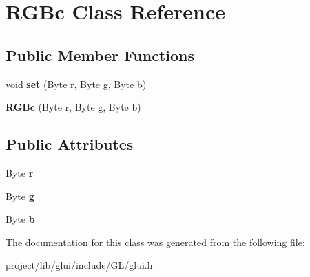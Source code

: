 \hypertarget{classRGBc}{\section{R\-G\-Bc Class Reference}
\label{classRGBc}
}
\subsection*{Public Member Functions}
\begin{DoxyCompactItemize}
\item 
\hypertarget{classRGBc_a60b887d5881c06dcb2ba0d2e75e01855}{void {\bfseries set} (Byte r, Byte g, Byte b)}\label{classRGBc_a60b887d5881c06dcb2ba0d2e75e01855}

\item 
\hypertarget{classRGBc_aaa6e6a4e21d3112836924657ea40cb84}{{\bfseries R\-G\-Bc} (Byte r, Byte g, Byte b)}\label{classRGBc_aaa6e6a4e21d3112836924657ea40cb84}

\end{DoxyCompactItemize}
\subsection*{Public Attributes}
\begin{DoxyCompactItemize}
\item 
\hypertarget{classRGBc_a924706b7ae3839bd89d84a41a38ac86a}{Byte {\bfseries r}}\label{classRGBc_a924706b7ae3839bd89d84a41a38ac86a}

\item 
\hypertarget{classRGBc_a0b4fc208f3eb1d14adbd67a0d7c72843}{Byte {\bfseries g}}\label{classRGBc_a0b4fc208f3eb1d14adbd67a0d7c72843}

\item 
\hypertarget{classRGBc_a587697e813f12fadbaafea78450dce93}{Byte {\bfseries b}}\label{classRGBc_a587697e813f12fadbaafea78450dce93}

\end{DoxyCompactItemize}


The documentation for this class was generated from the following file\-:\begin{DoxyCompactItemize}
\item 
project/lib/glui/include/\-G\-L/glui.\-h\end{DoxyCompactItemize}
